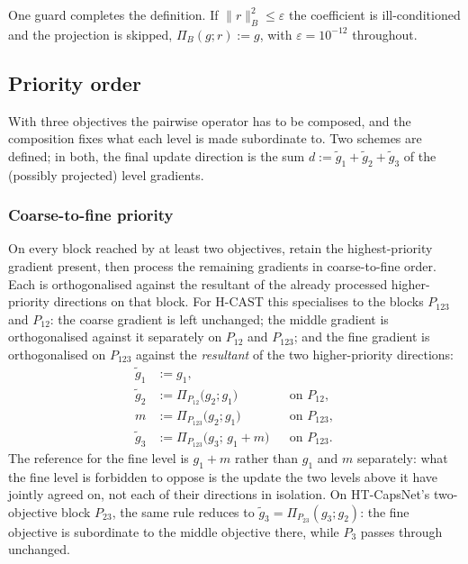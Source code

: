 One guard completes the definition. If
$\lVert r\rVert_B^2 \le \varepsilon$ the coefficient is ill-conditioned and the
projection is skipped, $\Pi_B(g;r):=g$, with $\varepsilon=10^{-12}$ throughout.

\subsection{Priority order}
\label{ssec:lex_modes}

With three objectives the pairwise operator has to be composed, and the
composition fixes what each level is made subordinate to. Two schemes are
defined; in both, the final update direction is the sum
$d := \tilde g_1 + \tilde g_2 + \tilde g_3$ of the (possibly projected) level
gradients.

\subsubsection{Coarse-to-fine priority}

On every block reached by at least two objectives, retain the
highest-priority gradient present, then process the remaining gradients in
coarse-to-fine order. Each is orthogonalised against the resultant of the
already processed higher-priority directions on that block. For H-CAST this
specialises to the blocks $P_{123}$ and $P_{12}$: the coarse gradient is left
unchanged; the middle gradient is orthogonalised against it separately on
$P_{12}$ and $P_{123}$; and the fine gradient is orthogonalised on
$P_{123}$ against the
\emph{resultant} of the two higher-priority directions:
\[
\begin{aligned}
\tilde g_1 &:= g_1, \\
\tilde g_2 &:= \Pi_{P_{12}}\!\big(g_2;g_1\big) &&\text{on } P_{12}, \\
m &:= \Pi_{P_{123}}\!\big(g_2;g_1\big) &&\text{on } P_{123}, \\
\tilde g_3 &:= \Pi_{P_{123}}\!\big(g_3;\,g_1+m\big) &&\text{on } P_{123}.
\end{aligned}
\]
The reference for the fine level is $g_1+m$ rather than $g_1$ and $m$ separately: what the fine level is forbidden to oppose is the update the two levels above
it have jointly agreed on, not each of their directions in isolation.
On HT-CapsNet's two-objective block $P_{23}$, the same rule reduces to
$\tilde g_3=\Pi_{P_{23}}(g_3;g_2)$: the fine objective is subordinate to
the middle objective there, while $P_{3}$ passes through unchanged.

